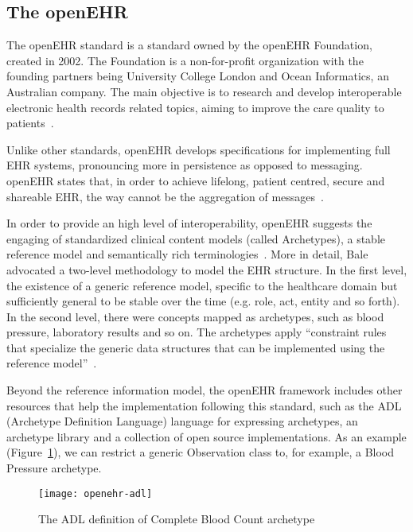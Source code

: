 \subsection{The openEHR} \label{sec:openehr}

The openEHR standard is a standard owned by the openEHR Foundation, created in 2002. The Foundation is a non-for-profit organization with the founding partners being University College London and Ocean Informatics, an Australian company. The main objective is to research and develop interoperable electronic health records related topics, aiming to improve the care quality to patients~\citep{Leslie2007}.

Unlike other standards, openEHR develops specifications for implementing full EHR systems, pronouncing more in persistence as opposed to messaging. openEHR states that, in order to achieve lifelong, patient centred, secure and shareable EHR, the way cannot be the aggregation of messages~\citep{Beale2002}.

In order to provide an high level of interoperability, openEHR suggests the engaging of standardized clinical content models (called Archetypes), a stable reference model and semantically rich terminologies~\citep{Atalag2010}. More in detail, Bale advocated a two-level methodology to model the EHR structure. In the first level, the existence of a generic reference model, specific to the healthcare domain but sufficiently general to be stable over the time (e.g. role, act, entity and so forth). In the second level, there were concepts mapped as archetypes, such as blood pressure, laboratory results and so on. The archetypes apply ``constraint rules  that specialize the generic data structures that can be implemented using the reference model''~\citep{Beale2002}.

Beyond the reference information model, the openEHR framework includes other resources that help the implementation following this standard, such as the ADL (Archetype Definition Language) language for expressing archetypes, an archetype library and a collection of open source implementations. As an example (Figure~\ref{fig:openehr-adl}), we can restrict a generic Observation class to, for example, a Blood Pressure archetype.

\begin{figure}[h]
\centering
\texttt{[image: openehr-adl]}
\caption[The ADL definition of Complete Blood Count archetype]{The ADL definition of Complete Blood Count archetype ~\citep{Eichelberg2005}}
\label{fig:openehr-adl}
\end{figure}



